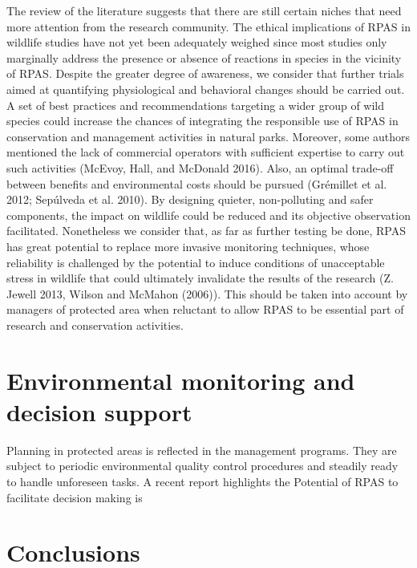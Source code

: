 \documentclass[]{interact}
\theoremstyle{plain}%
\theoremstyle{definition}
\theoremstyle{remark}
\begin{document}
The review of the literature suggests that there are still certain
niches that need more attention from the research community. The ethical
implications of RPAS in wildlife studies have not yet been adequately
weighed since most studies only marginally address the presence or
absence of reactions in species in the vicinity of RPAS. Despite the
greater degree of awareness, we consider that further trials aimed at
quantifying physiological and behavioral changes should be carried out.
A set of best practices and recommendations targeting a wider group of
wild species could increase the chances of integrating the responsible
use of RPAS in conservation and management activities in natural parks.
Moreover, some authors mentioned the lack of commercial operators with
sufficient expertise to carry out such activities (McEvoy, Hall, and
McDonald 2016). Also, an optimal trade-off between benefits and
environmental costs should be pursued (Grémillet et al. 2012; Sepúlveda
et al. 2010). By designing quieter, non-polluting and safer components,
the impact on wildlife could be reduced and its objective observation
facilitated. Nonetheless we consider that, as far as further testing be
done, RPAS has great potential to replace more invasive monitoring
techniques, whose reliability is challenged by the potential to induce
conditions of unacceptable stress in wildlife that could ultimately
invalidate the results of the research (Z. Jewell 2013, Wilson and
McMahon (2006)). This should be taken into account by managers of
protected area when reluctant to allow RPAS to be essential part of
research and conservation activities.

\section{Environmental monitoring and decision
support}\label{environmental-monitoring-and-decision-support}

Planning in protected areas is reflected in the management programs.
They are subject to periodic environmental quality control procedures
and steadily ready to handle unforeseen tasks. A recent report
highlights the Potential of RPAS to facilitate decision making is

\section{Conclusions}\label{conclusions}
\end{document}

